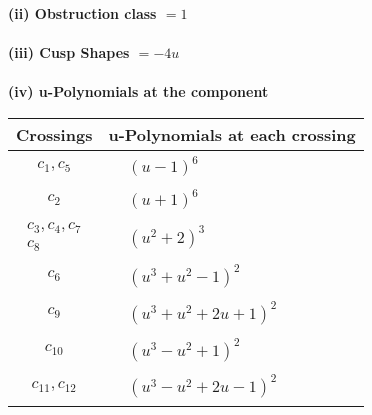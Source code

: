 \documentclass[1p]{elsarticle_modified}
\theoremstyle{definition}
\begin{document}
\flushleft \textbf{(ii) Obstruction class $= 1$}\\~\\
\flushleft \textbf{(iii) Cusp Shapes $= -4 u$}\\~\\
\newpage\renewcommand{\arraystretch}{1}
\flushleft \textbf{(iv) u-Polynomials at the component}\newline \\
\begin{tabular}{m{50pt}|m{274pt}}
Crossings & \hspace{64pt}u-Polynomials at each crossing \\
\hline $$\begin{aligned}c_{1},c_{5}\end{aligned}$$&$\begin{aligned}
&(u-1)^6
\end{aligned}$\\
\hline $$\begin{aligned}c_{2}\end{aligned}$$&$\begin{aligned}
&(u+1)^6
\end{aligned}$\\
\hline $$\begin{aligned}c_{3},c_{4},c_{7}\\c_{8}\end{aligned}$$&$\begin{aligned}
&(u^2+2)^3
\end{aligned}$\\
\hline $$\begin{aligned}c_{6}\end{aligned}$$&$\begin{aligned}
&(u^3+u^2-1)^2
\end{aligned}$\\
\hline $$\begin{aligned}c_{9}\end{aligned}$$&$\begin{aligned}
&(u^3+u^2+2 u+1)^2
\end{aligned}$\\
\hline $$\begin{aligned}c_{10}\end{aligned}$$&$\begin{aligned}
&(u^3- u^2+1)^2
\end{aligned}$\\
\hline $$\begin{aligned}c_{11},c_{12}\end{aligned}$$&$\begin{aligned}
&(u^3- u^2+2 u-1)^2
\end{aligned}$\\
\hline
\end{tabular}\\~\\
\end{document}
